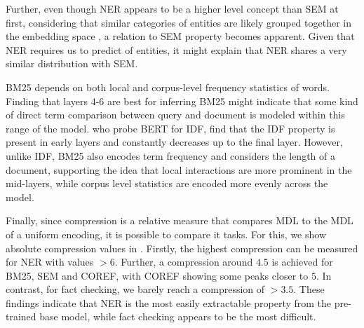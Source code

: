 Further, even though NER appears to be a higher level concept than SEM at first, considering that similar categories of entities are likely grouped together in the embedding space \citep{DBLP:journals/corr/abs-1301-3781, pennington2014glove}, a relation to SEM property becomes apparent. Given that NER requires us to predict  of entities, it might explain that NER shares a very similar distribution with SEM.

BM25 depends on both local and corpus-level frequency statistics of words. Finding that layers 4-6 are best for inferring BM25 might indicate that some kind of direct term comparison between query and document is modeled within this range of the model. \citep{https://doi.org/10.48550/arxiv.2202.12191} who probe BERT for IDF, find that the IDF property is present in early layers and constantly decreases up to the final layer. However, unlike IDF, BM25 also encodes term frequency and considers the length of a document, supporting the idea that local interactions are more prominent in the mid-layers, while corpus level statistics are encoded more evenly across the model.

Finally, since compression is a relative measure that compares MDL to the MDL of a uniform encoding, it is possible to compare it  tasks. For this, we show absolute compression values in . Firstly, the highest compression can be measured for NER with values $>6$. Further, a compression around $4.5$ is achieved for BM25, SEM and COREF, with COREF showing some peaks closer to $5$. In contrast, for fact checking, we barely reach a compression of $>3.5$. These findings indicate that NER is the most easily extractable property from the pre-trained base model, while fact checking appears to be the most difficult.

